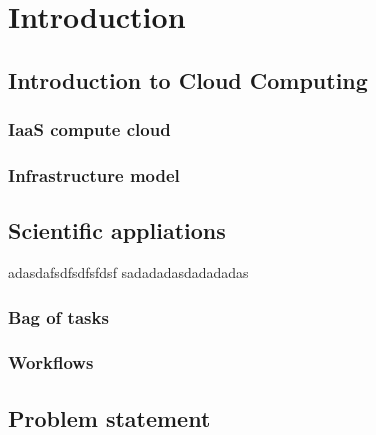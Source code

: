 \chapter{Introduction}
\label{chap:introduction} 


\section{Introduction to Cloud Computing}

\subsection{IaaS compute cloud}

\subsection{Infrastructure model}

\section{Scientific appliations}

adasdafsdfsdfsfdsf
sadadadasdadadadas

\subsection{Bag of tasks}

\subsection{Workflows}

\section{Problem statement}

